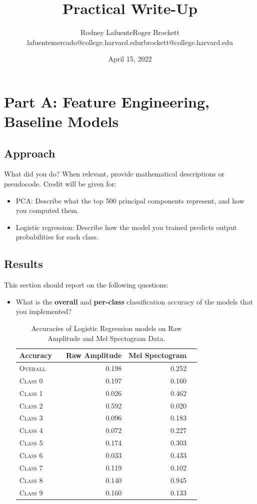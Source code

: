 \documentclass[11pt]{article}
\title{Practical Write-Up}
\author{Rodney Lafuente\hspace{4cm}Roger Brockett \\ 
lafuentemercado@college.harvard.edu\hspace{1cm}rbrockett@college.harvard.edu}
\date{April 15, 2022}
\begin{document}
\maketitle{}

\section{Part A: Feature Engineering, Baseline Models}

\subsection{Approach}

What did you do? When relevant, provide mathematical descriptions or pseudocode. Credit will be given for:

  \begin{itemize}
  \item PCA:  Describe what the top 500 principal components represent, and how you computed them.
  \item Logistic regression: Describe how the model you trained predicts output probabilities for each class.
  \end{itemize}

\subsection{Results}

This section should report on the following questions: 

\begin{itemize}
\item  What is the \textbf{overall} and \textbf{per-class} classification accuracy of the models that you implemented?
\begin{table}[h]
\centering
\begin{tabular}{llrrr}
    \toprule
    Accuracy &  & Raw Amplitude & Mel Spectogram \\
    \midrule
    \textsc{Overall} & & 0.198 & 0.252 \\
    \textsc{Class 0} & & 0.197 & 0.160 \\
    \textsc{Class 1} & & 0.026 & 0.462 \\
    \textsc{Class 2} & & 0.592 & 0.020 \\
    \textsc{Class 3} & & 0.096 & 0.183 \\
    \textsc{Class 4} & & 0.072 & 0.227 \\
    \textsc{Class 5} & & 0.174 & 0.303 \\
    \textsc{Class 6} & & 0.033 & 0.433 \\
    \textsc{Class 7} & & 0.119 & 0.102 \\
    \textsc{Class 8} & & 0.140 & 0.945 \\
    \textsc{Class 9} & & 0.160 & 0.133 \\
    \bottomrule
\end{tabular}
\caption{\label{tab:rf_results} Accuracies of Logistic Regression models on Raw Amplitude and Mel Spectogram Data.}
\end{table}
\end{itemize}
\end{document}
